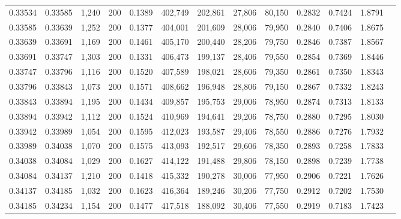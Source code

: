 \begin{tabular}{rrrrrrrrrrrrr}
0.33534 & 0.33585 &  1,240 & 200 &                                     0.1389 & 402,749 & 202,861 &  27,806 &  80,150 & 0.2832 & 0.7424 & 1.8791 \\
0.33585 & 0.33639 &  1,252 & 200 &                                     0.1377 & 404,001 & 201,609 &  28,006 &  79,950 & 0.2840 & 0.7406 & 1.8675 \\
0.33639 & 0.33691 &  1,169 & 200 &                                     0.1461 & 405,170 & 200,440 &  28,206 &  79,750 & 0.2846 & 0.7387 & 1.8567 \\
0.33691 & 0.33747 &  1,303 & 200 &                                     0.1331 & 406,473 & 199,137 &  28,406 &  79,550 & 0.2854 & 0.7369 & 1.8446 \\
0.33747 & 0.33796 &  1,116 & 200 &                                     0.1520 & 407,589 & 198,021 &  28,606 &  79,350 & 0.2861 & 0.7350 & 1.8343 \\
0.33796 & 0.33843 &  1,073 & 200 &                                     0.1571 & 408,662 & 196,948 &  28,806 &  79,150 & 0.2867 & 0.7332 & 1.8243 \\
0.33843 & 0.33894 &  1,195 & 200 &                                     0.1434 & 409,857 & 195,753 &  29,006 &  78,950 & 0.2874 & 0.7313 & 1.8133 \\
0.33894 & 0.33942 &  1,112 & 200 &                                     0.1524 & 410,969 & 194,641 &  29,206 &  78,750 & 0.2880 & 0.7295 & 1.8030 \\
0.33942 & 0.33989 &  1,054 & 200 &                                     0.1595 & 412,023 & 193,587 &  29,406 &  78,550 & 0.2886 & 0.7276 & 1.7932 \\
0.33989 & 0.34038 &  1,070 & 200 &                                     0.1575 & 413,093 & 192,517 &  29,606 &  78,350 & 0.2893 & 0.7258 & 1.7833 \\
0.34038 & 0.34084 &  1,029 & 200 &                                     0.1627 & 414,122 & 191,488 &  29,806 &  78,150 & 0.2898 & 0.7239 & 1.7738 \\
0.34084 & 0.34137 &  1,210 & 200 &                                     0.1418 & 415,332 & 190,278 &  30,006 &  77,950 & 0.2906 & 0.7221 & 1.7626 \\
0.34137 & 0.34185 &  1,032 & 200 &                                     0.1623 & 416,364 & 189,246 &  30,206 &  77,750 & 0.2912 & 0.7202 & 1.7530 \\
0.34185 & 0.34234 &  1,154 & 200 &                                     0.1477 & 417,518 & 188,092 &  30,406 &  77,550 & 0.2919 & 0.7183 & 1.7423 \\

\end{tabular}

